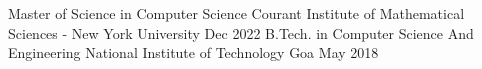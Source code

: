 

\begin{cventries}

 \cventry
 {Master of Science in Computer Science} 
    { Courant Institute of Mathematical Sciences - New York University} %
    {Dec 2022} %
    { } %
    {}
    \vspace{-0.2cm}
  \cventry
    {B.Tech. in Computer Science And Engineering} %
    {National Institute of Technology Goa  } %
    {May 2018} %
    { } %
    {}
    \vspace{-0.7cm}
\end{cventries}
